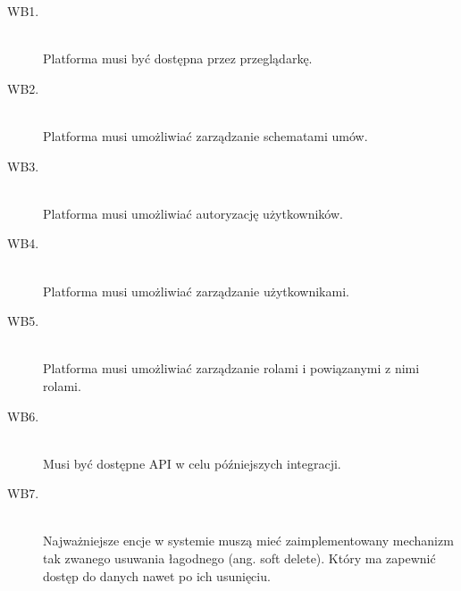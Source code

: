 \begin{description}
    \item[WB1.] \hfill \\
    Platforma musi być dostępna przez przeglądarkę. 

    \item[WB2.] \hfill \\
    Platforma musi umożliwiać zarządzanie schematami umów.

    \item[WB3.] \hfill \\
    Platforma musi umożliwiać autoryzację użytkowników.

    \item[WB4.] \hfill \\
    Platforma musi umożliwiać zarządzanie użytkownikami.

    \item[WB5.] \hfill \\
    Platforma musi umożliwiać zarządzanie rolami i powiązanymi z nimi rolami.

    \item[WB6.] \hfill \\
    Musi być dostępne API w celu późniejszych integracji.

    \item[WB7.] \hfill \\
    Najważniejsze encje w systemie muszą mieć zaimplementowany mechanizm tak zwanego usuwania łagodnego (ang. soft delete). Który ma zapewnić dostęp do danych nawet po ich usunięciu. 
\end{description}